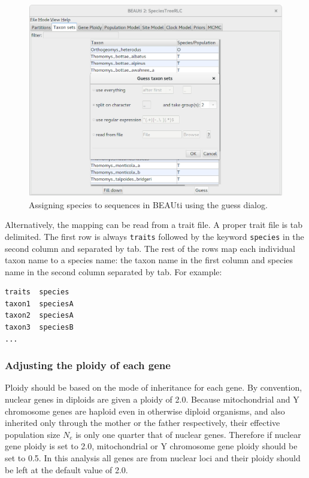 \documentclass{article}
\begin{document}
\begin{figure}[htb!]
\centering
\includegraphics[width=\textwidth]{figures/beauti-guess.png}
\caption{Assigning species to sequences in BEAUti using the guess dialog.}
\label{fig:taxonSets}
\end{figure}

Alternatively, the mapping can be read from a trait file. A proper trait file is
tab delimited. The first row is always \texttt{traits} followed by the keyword
\texttt{species} in the second column and separated by tab. The rest of the rows
map each individual taxon name to a species name: the taxon name in the first
column and species name in the second column separated by tab. For example:

\begin{minipage}[h]{0.7\textwidth}
\begin{verbatim}
traits	species
taxon1	speciesA
taxon2	speciesA
taxon3	speciesB
...
\end{verbatim}
\end{minipage}

\vspace{12pt}

\subsubsection*{Adjusting the ploidy of each gene}

Ploidy should be based on the mode of inheritance for each gene. By convention,
nuclear genes in diploids are given a ploidy of 2.0. Because mitochondrial and Y
chromosome genes are haploid even in otherwise diploid organisms, and also
inherited only through the mother or the father respectively, their effective
population size $N_e$ is only one quarter that of nuclear genes. Therefore if
nuclear gene ploidy is set to 2.0, mitochondrial or Y chromosome gene ploidy
should be set to 0.5. In this analysis all genes are from nuclear loci and their
ploidy should be left at the default value of 2.0.
\end{document}
